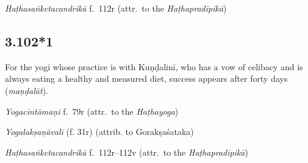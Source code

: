 \begin{ekdosis}
\begin{testimonia}[hp03_102]
\emph{Haṭhasaṅketacandrikā} f.~112r (attr.~to the \emph{Haṭhapradīpikā})
\begin{versinnote}
\end{versinnote}
\end{testimonia}



\subsection*{3.102*1}
\begin{translation}[hp03_102_1]
For the yogi whose practice is with Kuṇḍalinī, who has a vow of celibacy and is always eating a healthy and measured diet, success appears after forty days (\emph{maṇḍalāt}).
\end{translation}


\begin{testimonia}[hp03_102_1]
\emph{Yogacintāmaṇi} f.~79r (attr.~to the \emph{Haṭhayoga})
\begin{versinnote}
\end{versinnote}

\emph{Yogalakṣaṇāvalī} (f. 31r)  (attrib. to Gorakṣaśataka)
\begin{versinnote}
\end{versinnote}

\emph{Haṭhasaṅketacandrikā}  f.~112r--112v (attr.~to the \emph{Haṭhapradīpikā})
\begin{versinnote}
\end{versinnote}
\end{testimonia}


\end{ekdosis}
